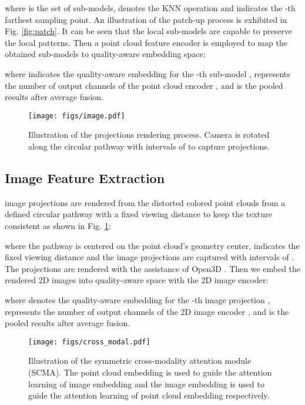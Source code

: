 \documentclass{article}
\begin{document}
where  is the set of sub-models,  denotes the KNN operation and  indicates the -th farthest sampling point. An illustration of the patch-up process is exhibited in Fig. \ref{fig:patch}. It can be seen that the local sub-models are capable to preserve the local patterns.
Then a point cloud feature encoder  is employed to map the obtained sub-models to quality-aware embedding space:


where  indicates the quality-aware embedding for the -th sub-model ,  represents the number of output channels of the point cloud encoder , and  is the pooled results after average fusion.



\begin{figure}[!t]
    \centering
    \texttt{[image: figs/image.pdf]}
    \caption{Illustration of the projections rendering process. Camera is rotated along the circular pathway with intervals of  to capture  projections. }
    \label{fig:image}
    \vspace{-0.175cm}
\end{figure}

\subsection{Image Feature Extraction}
\label{sec:image}
 image projections are rendered from the distorted colored point clouds from a defined circular pathway with a fixed viewing distance to keep the texture consistent as shown in Fig. \ref{fig:image}:


where the pathway is centered on the point cloud's geometry center,  indicates the fixed viewing distance and the  image projections are captured with intervals of . The projections are rendered with the assistance of Open3D \cite{zhou2018open3d}.
Then we embed the rendered 2D images into quality-aware space with the 2D image encoder:


where  denotes the quality-aware embedding for the -th image projection ,  represents the number of output channels of the 2D image encoder , and  is the pooled results after average fusion.



\begin{figure}[t]
    \centering
    \texttt{[image: figs/cross\_modal.pdf]}
    \caption{Illustration of the symmetric cross-modality attention module (SCMA). The point cloud embedding  is used to guide the attention learning of image embedding and the image embedding  is used to guide the attention learning of point cloud embedding respectively.}
    \label{fig:cross_modal}
\end{figure}
\end{document}
